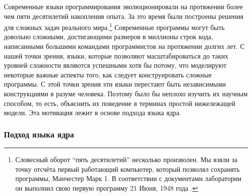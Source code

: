 Современные языки программирования эволюционировали на протяжении более чем пяти десятилетий накопления опыта. За это время были построены решения для сложных задач реального мира.\footnote{Словесный оборот ``пять десятилетий'' несколько произволен. Мы взяли за точку отсчёта первый работающий компьютер, который позволял сохранять программы, Манчестер Марк 1. В соответствии с документами лаборатории он выполнил свою первую программу 21 Июня, 1948 года \cite{178}.} Современные программы могут быть довольно сложными, достигающими размеров в миллионы строк кода, написанными большими командами программистов на протяжении долгих лет. С нашей точки зрения, языки, которые позволяют масштабироваться до таких уровней сложности являются успешными хотя бы потому, что моделируют некоторые важные аспекты того, как следует конструировать сложные программы. С этой точки зрения эти языки перестают быть независимыми конструкциями в разуме человека. Поэтому было бы неплохо изучить их научным способом, то есть, объяснить их поведение в терминах простой нижележащей модели. Эта мотивация лежит в основе подхода языка ядра.


\subsubsection{Подход языка ядра}

